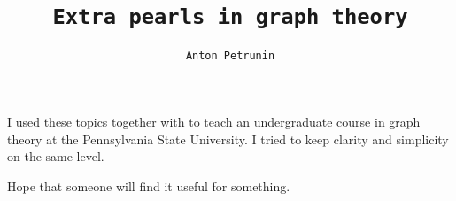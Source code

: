 \title{\tt Extra pearls in graph theory}
\author{\tt Anton Petrunin}
\date{}
\maketitle

I used these topics together with \cite{pearls} to teach an undergraduate course in graph theory at the Pennsylvania State University.
I tried to keep clarity and simplicity on the same level.

Hope that someone will find it useful for something.

\null\vfill{}


\thispagestyle{empty}
\newpage
\tableofcontents
